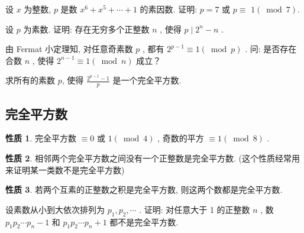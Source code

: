 \documentclass[aspectratio=169]{ctexbeamer}
\theoremstyle{definition}
\newtheorem{property}{性质}[section]
\begin{document}
\begin{frame}[t]
\begin{example}
	设 $x$ 为整数,  $p$ 是数 $x^{6}+x^{5}+\cdots+1$ 的素因数. 证明:  $p=7$ 或 $p \equiv$ $1(\bmod 7)$.
\end{example}
\end{frame}

\begin{frame}[t]
\begin{example}
	设 $p$ 为素数. 证明: 存在无穷多个正整数 $n$ , 使得 $p \mid 2^{n}-n$ .
\end{example}
\end{frame}

\begin{frame}[t]
\begin{example}
	由 Fermat 小定理知, 对任意奇素数 $p$ , 都有 $2^{p-1} \equiv 1(\bmod p)$ . 问: 是否存在合数 $n$ , 使得 $2^{n-1} \equiv 1(\bmod n)$ 成立？
\end{example}
\end{frame}

\begin{frame}[t]
\begin{example}
	求所有的素数 $p$, 使得 $\frac{2^{p-1}-1}{p}$ 是一个完全平方数.
\end{example}
\end{frame}

\subsection{完全平方数}\setcounter{theorem}{0}
\begin{frame}
\begin{property}\label{prop:完全平方数-1}
	完全平方数 $\equiv 0$ 或 $1(\bmod 4)$ , 奇数的平方 $\equiv 1(\bmod 8)$ .
\end{property}
\begin{property}
	相邻两个完全平方数之间没有一个正整数是完全平方数. (这个性质经常用来证明某一类数不是完全平方数)
\end{property}
\begin{property}
	若两个互素的正整数之积是完全平方数, 则这两个数都是完全平方数.
\end{property}
\end{frame}


\begin{frame}[t]
\begin{example}
	设素数从小到大依次排列为 $p_{1}, p_{2}, \cdots$ . 证明: 对任意大于 1 的正整数 $n$ , 数 $p_{1} p_{2} \cdots p_{n}-1$ 和 $p_{1} p_{2} \cdots p_{n}+1$ 都不是完全平方数.
\end{example}
\end{frame}
\end{document}
